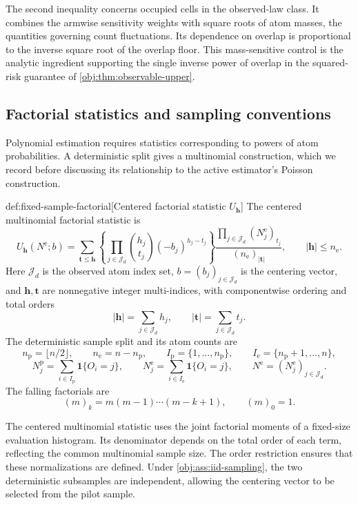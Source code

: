 The second inequality concerns occupied cells in the observed-law class. It combines the armwise sensitivity weights with square roots of atom masses, the quantities governing count fluctuations. Its dependence on overlap is proportional to the inverse square root of the overlap floor. This mass-sensitive control is the analytic ingredient supporting the single inverse power of overlap in the squared-risk guarantee of \cref{obj:thm:observable-upper}.

\subsection{Factorial statistics and sampling conventions}

Polynomial estimation requires statistics corresponding to powers of atom probabilities. A deterministic split gives a multinomial construction, which we record before discussing its relationship to the active estimator's Poisson construction.

\begin{definitionv}{def:fixed-sample-factorial}[Centered factorial statistic \(U_{\boldsymbol h}\)]
The centered multinomial factorial statistic is
\[
U_{\boldsymbol h}(N^{\mathrm e};b)
=
\sum_{\boldsymbol t\le\boldsymbol h}
\left\{
\prod_{j\in\mathcal J_d}
\binom{h_j}{t_j}(-b_j)^{h_j-t_j}
\right\}
\frac{\prod_{j\in\mathcal J_d}(N_j^{\mathrm e})_{t_j}}
{(n_{\mathrm e})_{|\boldsymbol t|}},
\qquad
|\boldsymbol h|\le n_{\mathrm e}.
\]
Here \(\mathcal J_d\) is the observed atom index set, \(b=(b_j)_{j\in\mathcal J_d}\) is the centering vector, and \(\boldsymbol h,\boldsymbol t\) are nonnegative integer multi-indices, with componentwise ordering and total orders
\[
|\boldsymbol h|=\sum_{j\in\mathcal J_d}h_j,
\qquad
|\boldsymbol t|=\sum_{j\in\mathcal J_d}t_j.
\]
The deterministic sample split and its atom counts are
\[
n_{\mathrm p}=\lfloor n/2\rfloor,
\qquad
n_{\mathrm e}=n-n_{\mathrm p},
\qquad
I_{\mathrm p}=\{1,\ldots,n_{\mathrm p}\},
\qquad
I_{\mathrm e}=\{n_{\mathrm p}+1,\ldots,n\},
\]
\[
N_j^{\mathrm p}
=\sum_{i\in I_{\mathrm p}}\mathbf 1\{O_i=j\},
\qquad
N_j^{\mathrm e}
=\sum_{i\in I_{\mathrm e}}\mathbf 1\{O_i=j\},
\qquad
N^{\mathrm e}=(N_j^{\mathrm e})_{j\in\mathcal J_d}.
\]
The falling factorials are
\[
(m)_k=m(m-1)\cdots(m-k+1),
\qquad
(m)_0=1.
\]
\end{definitionv}

The centered multinomial statistic  uses the joint factorial moments of a fixed-size evaluation histogram. Its denominator depends on the total order of each term, reflecting the common multinomial sample size. The order restriction ensures that these normalizations are defined. Under \cref{obj:ass:iid-sampling}, the two deterministic subsamples are independent, allowing the centering vector to be selected from the pilot sample.

